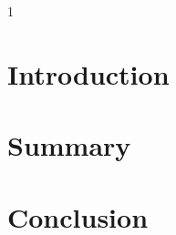 \documentclass [12pt,a4paper] {article}
\begin{document}
\setcounter {page} {1}

\section{Introduction}\label{sec:One}
	\lipsum[1]
		\cleardoublepage

\section{Summary}\label{sec:four}
	 \lipsum[1]
	 	\cleardoublepage

\section{Conclusion}\label{sec:Conclusion}
	 \lipsum[1]
	 	\cleardoublepage





 
 
\end{document}
